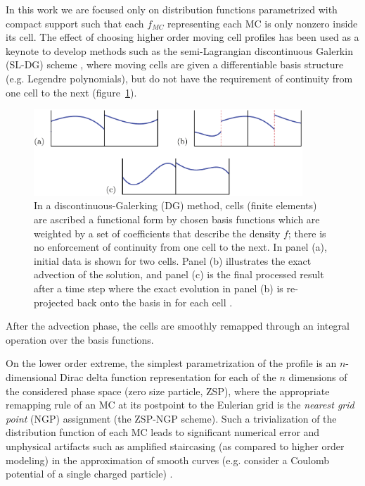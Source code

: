 \documentclass[11pt,titlepage]{report}
\begin{document}
In this work we are focused only on distribution functions parametrized with compact support such that each $f_{MC}$ representing each MC is only nonzero inside its cell. The effect of choosing higher order moving cell profiles has been used as a keynote to develop methods such as the semi-Lagrangian discontinuous Galerkin (SL-DG) scheme \cite{Rossmanith11}, where moving cells are given a differentiable basis structure (e.g. Legendre polynomials), but do not have the requirement of continuity from one cell to the next (figure~\ref{fig:Rossmanith_fig1}).


\begin{figure}[h!]
  \centering
    \includegraphics[width=0.9\textwidth]{graphics/DG.eps}
  \caption{In a discontinuous-Galerking (DG) method, cells (finite elements) are ascribed a functional form by chosen basis functions which are weighted by a set of coefficients that describe the density $f$; there is no enforcement of continuity from one cell to the next. In panel (a), initial data is shown for two cells. Panel (b) illustrates the exact advection of the solution, and panel (c) is the final processed result after a time step where the exact evolution in panel (b) is re-projected back onto the basis in for each cell \cite{Rossmanith11}.}
  \label{fig:Rossmanith_fig1}
\end{figure}

\noindent After the advection phase, the cells are smoothly remapped through an integral operation over the basis functions.

On the lower order extreme, the simplest parametrization of the profile is an $n$-dimensional Dirac delta function representation for each of the $n$ dimensions of the considered phase space (zero size particle, ZSP), where the appropriate remapping rule of an MC at its postpoint to the Eulerian grid is the \emph{nearest grid point} (NGP) assignment (the ZSP-NGP scheme). Such a trivialization of the distribution function of each MC leads to significant numerical error and unphysical artifacts such as amplified staircasing (as compared to higher order modeling) in the approximation of smooth curves (e.g. consider a Coulomb potential of a single charged particle) \cite{Birdsall69}.
\end{document}
